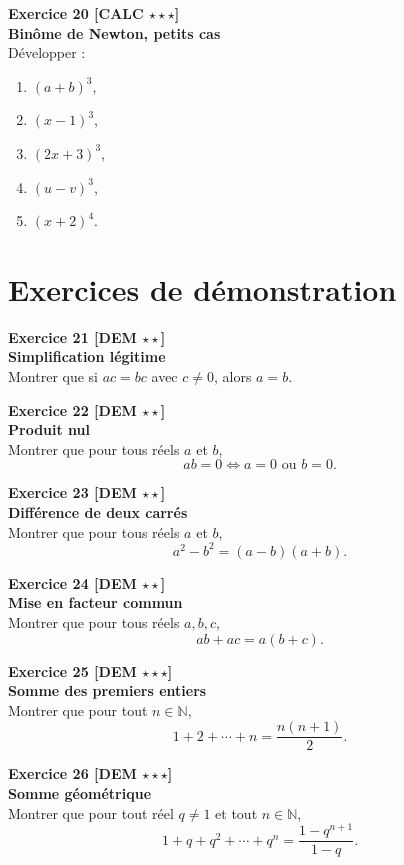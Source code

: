\documentclass[11pt,a4paper]{article}
\begin{document}
\textbf{Exercice 20 [CALC $\star\star\star$]}\\
\textbf{Binôme de Newton, petits cas}\\
Développer :
\begin{enumerate}[label=\alph*)]
    \item $(a+b)^3$,
    \item $(x-1)^3$,
    \item $(2x+3)^3$,
    \item $(u-v)^3$,
    \item $(x+2)^4$.
\end{enumerate}

\newpage

\section*{Exercices de démonstration}

\textbf{Exercice 21 [DEM $\star\star$]}\\
\textbf{Simplification légitime}\\
Montrer que si $ac=bc$ avec $c\neq 0$, alors $a=b$.

\textbf{Exercice 22 [DEM $\star\star$]}\\
\textbf{Produit nul}\\
Montrer que pour tous réels $a$ et $b$,
\[
ab=0 \Longleftrightarrow a=0 \text{ ou } b=0.
\]

\textbf{Exercice 23 [DEM $\star\star$]}\\
\textbf{Différence de deux carrés}\\
Montrer que pour tous réels $a$ et $b$,
\[
a^2-b^2=(a-b)(a+b).
\]

\textbf{Exercice 24 [DEM $\star\star$]}\\
\textbf{Mise en facteur commun}\\
Montrer que pour tous réels $a,b,c$,
\[
ab+ac=a(b+c).
\]

\textbf{Exercice 25 [DEM $\star\star\star$]}\\
\textbf{Somme des premiers entiers}\\
Montrer que pour tout $n\in\mathbb{N}$,
\[
1+2+\cdots+n=\frac{n(n+1)}{2}.
\]

\textbf{Exercice 26 [DEM $\star\star\star$]}\\
\textbf{Somme géométrique}\\
Montrer que pour tout réel $q\neq 1$ et tout $n\in\mathbb{N}$,
\[
1+q+q^2+\cdots+q^n=\frac{1-q^{n+1}}{1-q}.
\]
\end{document}
